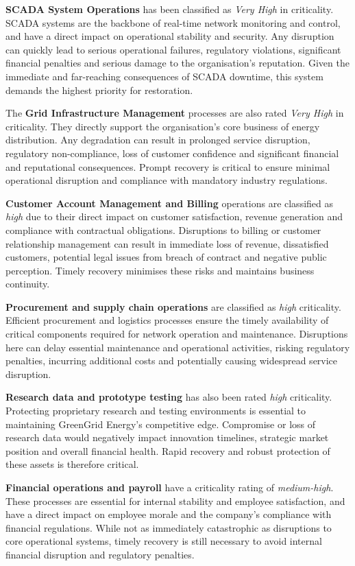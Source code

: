 \textbf{\ac{SCADA} System Operations} has been classified as \emph{Very High} in criticality. \ac{SCADA} systems are the backbone of real-time network monitoring and control, and have a direct impact on operational stability and security. Any disruption can quickly lead to serious operational failures, regulatory violations, significant financial penalties and serious damage to the organisation's reputation. Given the immediate and far-reaching consequences of \ac{SCADA} downtime, this system demands the highest priority for restoration.

The \textbf{Grid Infrastructure Management} processes are also rated \emph{Very High} in criticality. They directly support the organisation's core business of energy distribution. Any degradation can result in prolonged service disruption, regulatory non-compliance, loss of customer confidence and significant financial and reputational consequences. Prompt recovery is critical to ensure minimal operational disruption and compliance with mandatory industry regulations.

\textbf{Customer Account Management and Billing} operations are classified as \emph{high} due to their direct impact on customer satisfaction, revenue generation and compliance with contractual obligations. Disruptions to billing or customer relationship management can result in immediate loss of revenue, dissatisfied customers, potential legal issues from breach of contract and negative public perception. Timely recovery minimises these risks and maintains business continuity.

\textbf{Procurement and supply chain operations} are classified as \emph{high} criticality. Efficient procurement and logistics processes ensure the timely availability of critical components required for network operation and maintenance. Disruptions here can delay essential maintenance and operational activities, risking regulatory penalties, incurring additional costs and potentially causing widespread service disruption.

\textbf{Research data and prototype testing} has also been rated \emph{high} criticality. Protecting proprietary research and testing environments is essential to maintaining GreenGrid Energy's competitive edge. Compromise or loss of research data would negatively impact innovation timelines, strategic market position and overall financial health. Rapid recovery and robust protection of these assets is therefore critical.

\textbf{Financial operations and payroll} have a criticality rating of \emph{medium-high}. These processes are essential for internal stability and employee satisfaction, and have a direct impact on employee morale and the company's compliance with financial regulations. While not as immediately catastrophic as disruptions to core operational systems, timely recovery is still necessary to avoid internal financial disruption and regulatory penalties.

